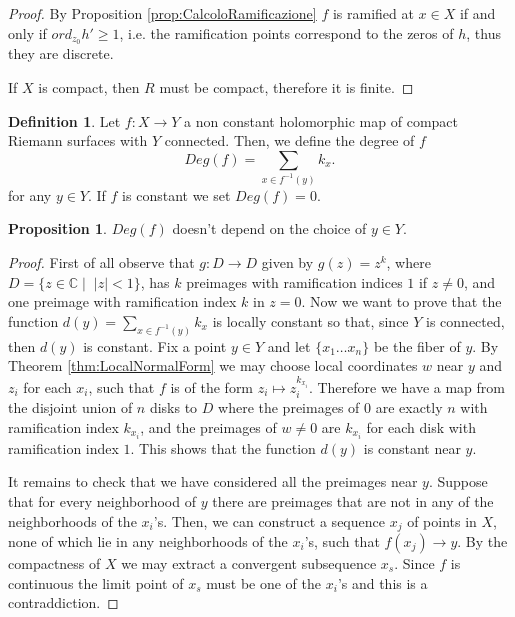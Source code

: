 \documentclass[12pt,a4paper,openright,twoside]{report}
\theoremstyle{definition} %
\newtheorem{proposition}[theorem]{Proposition}
\newtheorem{definition}[theorem]{Definition}
\def \C {\mathbb{C}}
\begin{document}
\begin{proof}
    By Proposition \ref{prop:CalcoloRamificazione} \(f\) is ramified at \(x \in X\) if and only if \(ord_{z_0}h' \geq 1\), i.e. the ramification points correspond to the zeros of \(h\), thus they are discrete.
    
    If \(X\) is compact, then \(R\) must be compact, therefore it is finite.
\end{proof}

\begin{definition}
    Let \(f : X \to Y\) a non constant holomorphic map of compact Riemann surfaces with \(Y\) connected. Then, we define the degree of \(f\)
    \[
    Deg(f) = \sum_{x \in f^{-1}(y)} k_x .
    \]
    for any \(y \in Y\).
    If \(f\) is constant we set \(Deg(f) = 0\).
\end{definition}

\begin{proposition}
    \(Deg(f)\) doesn't depend on the choice of \(y \in Y\).
\end{proposition}

\begin{proof}
    First of all observe that \(g : D \to D\) given by \(g(z) = z^k\), where \(D = \{z \in \C \mid \; | z | < 1\}\), has \(k\) preimages with ramification indices \(1\) if \(z \neq 0\), and one preimage with ramification index \(k\) in \(z = 0\).
    Now we want to prove that the function \( d(y) = \displaystyle\sum_{x \in f^{-1}(y)} k_x\) is locally constant so that, since \(Y\) is connected, then \(d(y)\) is constant.
    Fix a point \(y \in Y\) and let \(\{x_1 \ldots x_n\}\) be the fiber of \(y\). By Theorem \ref{thm:LocalNormalForm} we may choose local coordinates \(w\) near \(y\) and \(z_i\) for each \(x_i\), such that \(f\) is of the form \(z_i \mapsto z_i^{k_{x_i}}\).
    Therefore we have a map from the disjoint union of \(n\) disks to \(D\) where the preimages of \( 0\) are exactly \(n\) with ramification index \(k_{x_i}\), and the preimages of \(w \neq 0\) are \(k_{x_i}\) for each disk with ramification index \(1\). This shows that the function \(d(y)\) is constant near \(y\).
    
    It remains to check that we have considered all the preimages near \(y\).
    Suppose that for every neighborhood of \(y\) there are preimages that are not in any of the neighborhoods of the \(x_i\)'s. Then, we can construct a sequence \(x_j\) of points in \(X\), none of which lie in any neighborhoods of the \(x_i\)'s, such that \(f(x_j) \to y\). By the compactness of \(X\) we may extract a convergent subsequence \(x_s\). Since \(f\) is continuous the limit point of \(x_s\) must be one of the \(x_i\)'s and this is a contraddiction.
\end{proof}
\end{document}
